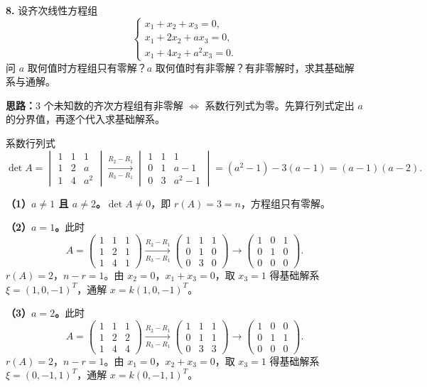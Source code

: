 \else \answerarea[10] \fi%

\textbf{8.} 设齐次线性方程组
\[
\begin{cases}
x_1+x_2+x_3=0,\\
x_1+2x_2+ax_3=0,\\
x_1+4x_2+a^2x_3=0.
\end{cases}
\]
问 $a$ 取何值时方程组只有零解？$a$ 取何值时有非零解？有非零解时，求其基础解系与通解。

\ifshowsolutions%

\textbf{思路：}$3$ 个未知数的齐次方程组有非零解 $\iff$ 系数行列式为零。先算行列式定出 $a$ 的分界值，再逐个代入求基础解系。

系数行列式
\[
\det A=\begin{vmatrix}
1&1&1\\
1&2&a\\
1&4&a^2
\end{vmatrix}
\xrightarrow[R_3-R_1]{R_2-R_1}
\begin{vmatrix}
1&1&1\\
0&1&a-1\\
0&3&a^2-1
\end{vmatrix}
=(a^2-1)-3(a-1)=(a-1)(a-2).
\]

\textbf{（1）$a\neq1$ 且 $a\neq2$。}$\det A\neq0$，即 $r(A)=3=n$，方程组只有零解。

\textbf{（2）$a=1$。}此时
\[
A=\begin{pmatrix}1&1&1\\1&2&1\\1&4&1\end{pmatrix}
\xrightarrow[R_3-R_1]{R_2-R_1}
\begin{pmatrix}1&1&1\\0&1&0\\0&3&0\end{pmatrix}
\to
\begin{pmatrix}1&0&1\\0&1&0\\0&0&0\end{pmatrix}.
\]
$r(A)=2$，$n-r=1$。由 $x_2=0$，$x_1+x_3=0$，取 $x_3=1$ 得基础解系 $\xi=(1,0,-1)^T$，通解 $x=k(1,0,-1)^T$。

\textbf{（3）$a=2$。}此时
\[
A=\begin{pmatrix}1&1&1\\1&2&2\\1&4&4\end{pmatrix}
\xrightarrow[R_3-R_1]{R_2-R_1}
\begin{pmatrix}1&1&1\\0&1&1\\0&3&3\end{pmatrix}
\to
\begin{pmatrix}1&0&0\\0&1&1\\0&0&0\end{pmatrix}.
\]
$r(A)=2$，$n-r=1$。由 $x_1=0$，$x_2+x_3=0$，取 $x_3=1$ 得基础解系 $\xi=(0,-1,1)^T$，通解 $x=k(0,-1,1)^T$。

